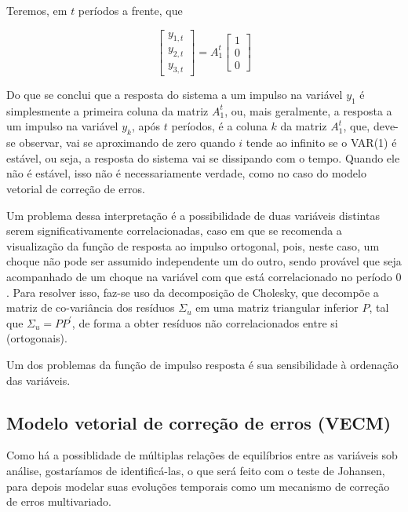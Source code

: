 \documentclass[a4paper,
               article,
               12pt,
               openany,
               oneside,
               english,
               brazil]{abntex2}
\numberwithin{equation}{section}
\begin{document}
    Teremos, em $ t $ períodos a frente, que

    \begin{equation*}
        \begin{bmatrix}
            y_{1,t} \\
            y_{2,t} \\
            y_{3,t}
        \end{bmatrix} =
        A_1^{t}
        \begin{bmatrix}
            1 \\
            0 \\
            0
        \end{bmatrix}
    \end{equation*}

    Do que se conclui que a resposta do sistema a um impulso na variável $ y_1 $ é simplesmente a primeira coluna da matriz $ A_1^{t} $, ou, mais geralmente, a resposta a um impulso na variável $ y_k $, após $ t $ períodos, é a coluna $ k $ da matriz $ A_1^{t} $, que, deve-se observar, vai se aproximando de zero quando $ i $ tende ao infinito se o VAR(1) é estável, ou seja, a resposta do sistema vai se dissipando com o tempo. Quando ele não é estável, isso não é necessariamente verdade, como no caso do modelo vetorial de correção de erros.

   Um problema dessa interpretação é a possibilidade de duas variáveis distintas serem significativamente correlacionadas, caso em que se recomenda a visualização da função de resposta ao impulso ortogonal, pois, neste caso, um choque não pode ser assumido independente um do outro, sendo provável que seja acompanhado de um choque na variável com que está correlacionado no período $ 0 $. Para resolver isso, faz-se uso da decomposição de Cholesky, que decompõe a matriz de co-variância dos resíduos $ \Sigma_u $ em uma matriz triangular inferior $ P $, tal que $ \Sigma_u = PP^{'} $, de forma a obter resíduos não correlacionados entre si (ortogonais).

   Um dos problemas da função de impulso resposta é sua sensibilidade à ordenação das variáveis.

    \subsection{Modelo vetorial de correção de erros (VECM)}

    Como há a possiblidade de múltiplas relações de equilíbrios entre as variáveis sob análise, gostaríamos de identificá-las, o que será feito com o teste de Johansen, para depois modelar suas evoluções temporais como um mecanismo de correção de erros multivariado.
\end{document}
